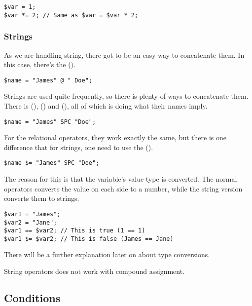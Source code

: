\begin{lstlisting}[style=ts]
$var = 1;
$var *= 2; // Same as $var = $var * 2;
\end{lstlisting}

\subsubsection{Strings}

As we are handling string, there got to be an easy way to concatenate them. In this case, there’s the  ().

\begin{lstlisting}[style=ts]
$name = "James" @ " Doe";
\end{lstlisting}

Strings are used quite frequently, so there is plenty of ways to concatenate them. There is  (),  () and  (), all of which is doing what their names imply.

\begin{lstlisting}[style=ts]
$name = "James" SPC "Doe";
\end{lstlisting}

For the relational operators, they work exactly the same, but there is one difference that for strings, one need to use the  (\code{\$=}).

\begin{lstlisting}[style=ts]
$name $= "James" SPC "Doe";
\end{lstlisting}

The reason for this is that the variable’s value type is converted. The normal operators converts the value on each side to a number, while the string version converts them to strings.

\begin{lstlisting}[style=ts]
$var1 = "James";
$var2 = "Jane";
$var1 == $var2; // This is true (1 == 1)
$var1 $= $var2; // This is false (James == Jane)
\end{lstlisting}

There will be a further explanation later on about type conversions.

String operators does not work with compound assignment.

\subsection{Conditions}

